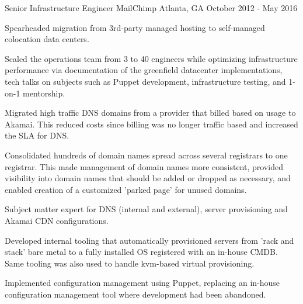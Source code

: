 \begin{cventries}
  \cventry
    {Senior Infrastructure Engineer} %
    {MailChimp} %
    {Atlanta, GA} %
    {October 2012 - May 2016} %
    {
      \begin{cvitems}
        \item {Spearheaded migration from 3rd-party managed hosting to self-managed colocation data centers.}
        \item {Scaled the operations team from 3 to 40 engineers while optimizing infrastructure performance via documentation of the greenfield datacenter implementations, tech talks on subjects such as Puppet development, infrastructure testing, and 1-on-1 mentorship.}
        \item {Migrated high traffic DNS domains from a provider that billed based on usage to Akamai. This reduced costs since billing was no longer traffic based and increased the SLA for DNS.}
        \item {Consolidated hundreds of domain names spread across several registrars to one registrar. This made management of domain names more consistent, provided visibility into domain names that should be added or dropped as necessary, and enabled creation of a customized 'parked page' for unused domains.}
        \item {Subject matter expert for DNS (internal and external), server provisioning and Akamai CDN configurations.}
        \item {Developed internal tooling that automatically provisioned servers from 'rack and stack' bare metal to a fully installed OS registered with an in-house CMDB. Same tooling was also used to handle kvm-based virtual provisioning.}
        \item {Implemented configuration management using Puppet, replacing an in-house configuration management tool where development had been abandoned.}
      \end{cvitems}
    }
 


\end{cventries}
